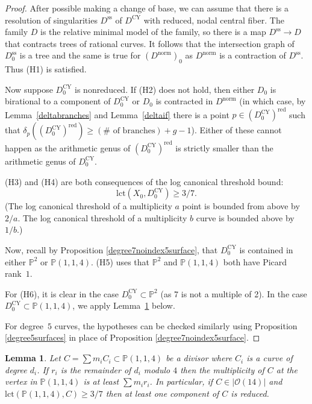 \documentclass[JEP,XML,SOM,Unicode,NoFloatCountersInSection,published]{cedram}
\theoremstyle{plain}
\newtheorem{lemma}[theorem]{Lemma}
\theoremstyle{definition}
\newcommand\PP{{\mathbb{P}}}
\newcommand\Oc{{\mathcal O}}
\newcommand\lct{\mathrm{lct}}
\newcommand\red{{\mathrm{red}}}
\newcommand\Dcy{{D^{\mathrm{CY}}}}
\newcommand\Dss{{D^{\mathrm{ss}}}}
\newcommand\Dsso{{D^{\mathrm{ss}}_0}}
\newcommand\Dcyo{{D^{\mathrm{CY}}_0}}
\newcommand\Dnorm{{D^{\mathrm{norm}}}}
\newcommand\Dnormo{{(\Dnorm)_0}}
\begin{document}
\begin{proof}
After possible making a change of base, we can assume that there is a resolution of singularities $\Dss$ of $\Dcy$ with reduced, nodal central fiber. The family $D$ is the relative minimal model of the family, so there is a map $\Dss\to D$ that contracts trees of rational curves. It follows that the intersection graph of $\Dsso$ is a tree and the same is true for $\Dnormo$ as $\Dnorm$ is a contraction of $\Dss$. Thus (H1) is satisfied.

Now suppose $\Dcyo$ is nonreduced. If (H2) does not hold, then either $D_0$ is birational to a component of $\Dcyo$ or $D_0$ is contracted in $\Dnorm$ (in which case, by Lemma~\ref{deltabranches} and Lemma~\ref{deltaif} there is a point $p\in(\Dcyo)^\red$ such that $\delta_p((\Dcyo)^\red)\ge (\#\text{ of branches})+g-1$). Either of these cannot happen as the arithmetic genus of $(\Dcyo)^\red$ is strictly smaller than the arithmetic genus of $\Dcyo$.

(H3) and (H4) are both consequences of the log canonical threshold bound:
\[
\lct(X_0,\Dcyo)\ge 3/7.
\]
(The log canonical threshold of a multiplicity $a$ point is bounded from above by $2/a$. The log canonical threshold of a multiplicity $b$ curve is bounded above by $1/b$.)

Now, recall by Proposition \ref{degree7noindex5surface}, that $\Dcyo$ is contained in either $\PP^2$ or $\PP(1,1,4)$. (H5) uses that $\PP^2$ and $\PP(1,1,4)$ both have Picard rank~$1$.

For (H6), it is clear in the case $\Dcyo\subset \PP^2$ (as 7 is not a multiple of 2). In the case $\Dcyo\subset \PP(1,1,4)$, we apply Lemma~\ref{remainders} below.

For degree~$5$ curves, the hypotheses can be checked similarly using Proposition \ref{degree5surfaces} in place of Proposition \ref{degree7noindex5surface}.
\end{proof}

\begin{lemma}\label{remainders}
Let $C=\sum m_i C_i\subset \PP(1,1,4)$ be a divisor where $C_i$ is a curve of degree $d_i$. If $r_i$ is the remainder of $d_i$ modulo $4$ then the multiplicity of $C$ at the vertex in $\PP(1,1,4)$ is at least $\sum m_ir_i$. In particular, if $C\in |\Oc(14)|$ and $\lct(\PP(1,1,4),C)\ge 3/7$ then at least one component of $C$ is reduced.
\end{lemma}
\end{document}
